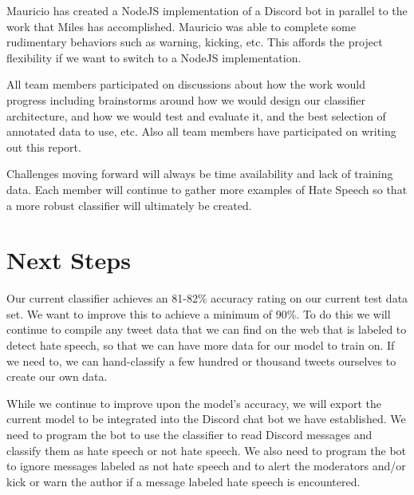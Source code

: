 \documentclass[conference]{sig-alternate-05-2015}
\begin{document}
Mauricio has created a NodeJS implementation of a Discord bot in parallel to the work that Miles has accomplished.  Mauricio was able to complete some rudimentary behaviors such as warning, kicking, etc.  This affords the project flexibility if we want to switch to a NodeJS implementation.

All team members participated on discussions about how the work would progress including brainstorms around how we would design our classifier architecture, and how we would test and evaluate it, and the best selection of annotated data to use, etc. Also all team members have participated on writing out this report. 

Challenges moving forward will always be time availability and lack of training data.  Each member will continue to gather more examples of Hate Speech so that a more robust classifier will ultimately be created.  

\section{Next Steps}

Our current classifier achieves an 81-82\% accuracy rating on our current test data set. We want to improve this to achieve a minimum of 90\%. To do this we will continue to compile any tweet data that we can find on the web that is labeled to detect hate speech, so that we can have more data for our model to train on. If we need to, we can hand-classify a few hundred or thousand tweets ourselves to create our own data. 

While we continue to improve upon the model's accuracy, we will export the current model to be integrated into the Discord chat bot we have established. We need to program the bot to use the classifier to read Discord messages and classify them as hate speech or not hate speech. We also need to program the bot to ignore messages labeled as not hate speech and to alert the moderators and/or kick or warn the author if a message labeled hate speech is encountered.



\end{document}
